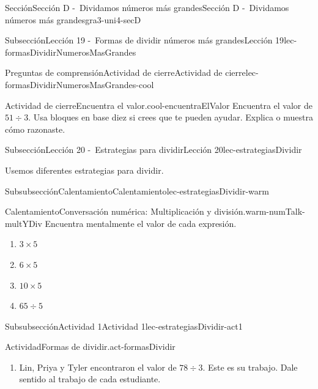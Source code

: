 \documentclass[twoside,10pt,]{article}
\begin{document}
\begin{sectionptx}{Sección}{Sección D -~Dividamos números más grandes}{}{Sección D -~Dividamos números más grandes}{}{}{gra3-uni4-secD}
\begin{subsectionptx}{Subsección}{Lección 19 -~Formas de dividir números más grandes}{}{Lección 19}{}{}{lec-formasDividirNumerosMasGrandes}
\begin{reading-questions-subsubsection}{Preguntas de comprensión}{Actividad de cierre}{}{Actividad de cierre}{}{}{lec-formasDividirNumerosMasGrandes-cool}
\begin{project}{Actividad de cierre}{Encuentra el valor.}{cool-encuentraElValor}%
Encuentra el valor de \(51 \div 3.\) Usa bloques en base diez si crees que te pueden ayudar. Explica o muestra cómo razonaste.%
\end{project}%
\end{reading-questions-subsubsection}
\end{subsectionptx}
%
%
\typeout{************************************************}
\typeout{************************************************}
%
\begin{subsectionptx}{Subsección}{Lección 20 -~Estrategias para dividir}{}{Lección 20}{}{}{lec-estrategiasDividir}
\begin{introduction}{}%
Usemos diferentes estrategias para dividir.%
\end{introduction}%
%
%
\typeout{************************************************}
\typeout{************************************************}
%
\begin{subsubsectionptx}{Subsubsección}{Calentamiento}{}{Calentamiento}{}{}{lec-estrategiasDividir-warm}
\begin{exploration}{Calentamiento}{Conversación numérica: Multiplicación y división.}{warm-numTalk-multYDiv}%
Encuentra mentalmente el valor de cada expresión.%
%
\begin{enumerate}[label={\Alph*.}]
\item{}\(\displaystyle 3\times 5\)%
\item{}\(\displaystyle 6\times 5\)%
\item{}\(\displaystyle 10\times 5\)%
\item{}\(\displaystyle 65\div 5\)%
\end{enumerate}
\end{exploration}%
\end{subsubsectionptx}
%
%
\typeout{************************************************}
\typeout{************************************************}
%
\begin{subsubsectionptx}{Subsubsección}{Actividad 1}{}{Actividad 1}{}{}{lec-estrategiasDividir-act1}
\begin{activity}{Actividad}{Formas de dividir.}{act-formasDividir}%
%
\begin{enumerate}
\item{}Lin, Priya y Tyler encontraron el valor de \(78 \div 3\). Este es su trabajo. Dale sentido al trabajo de cada estudiante.%

\end{enumerate}
\end{activity}
\end{subsubsectionptx}
\end{subsectionptx}
\end{sectionptx}
\end{document}
